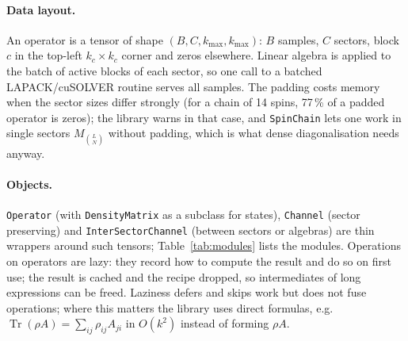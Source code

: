 \documentclass[11pt]{article}
\DeclareMathOperator{\Tr}{Tr}
\begin{document}
\paragraph{Data layout.} An operator is a tensor of shape $(B,C,k_{\max},k_{\max})$: $B$ samples, $C$
sectors, block $c$ in the top-left $k_c\times k_c$ corner and zeros elsewhere. Linear algebra is applied
to the batch of active blocks of each sector, so one call to a batched LAPACK/cuSOLVER routine serves all
samples. The padding costs memory when the sector sizes differ strongly (for a chain of 14 spins,
77\,\% of a padded operator is zeros); the library warns in that case, and \texttt{SpinChain} lets one work
in single sectors $M_{\binom LN}$ without padding, which is what dense diagonalisation needs anyway.

\paragraph{Objects.} \texttt{Operator} (with \texttt{DensityMatrix} as a subclass for states),
\texttt{Channel} (sector preserving) and \texttt{InterSectorChannel} (between sectors or algebras) are
thin wrappers around such tensors; Table~\ref{tab:modules} lists the modules. Operations on operators
are lazy: they record how to compute the result and do so on first use; the result is cached and the
recipe dropped, so intermediates of long expressions can be freed. Laziness defers and skips work but
does not fuse operations; where this matters the library uses direct formulas, e.g.\
$\Tr(\rho A)=\sum_{ij}\rho_{ij}A_{ji}$ in $O(k^2)$ instead of forming $\rho A$.
\end{document}
